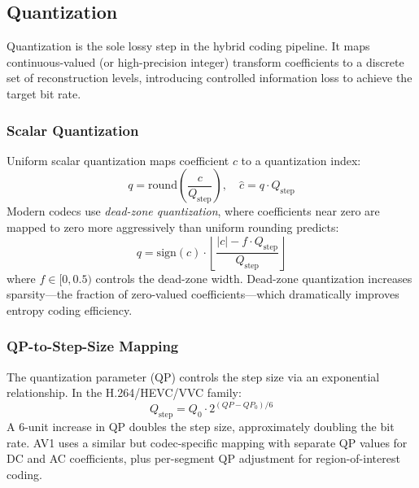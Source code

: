 \subsection{Quantization}
\label{sec:quantization}

Quantization is the sole lossy step in the hybrid coding pipeline. It maps
continuous-valued (or high-precision integer) transform coefficients to a
discrete set of reconstruction levels, introducing controlled information
loss to achieve the target bit rate.

\subsubsection{Scalar Quantization}

Uniform scalar quantization maps coefficient $c$ to a quantization index:
\begin{equation}
  q = \text{round}\!\left(\frac{c}{Q_{\text{step}}}\right), \quad
  \hat{c} = q \cdot Q_{\text{step}}
  \label{eq:uniform-quant}
\end{equation}
Modern codecs use \emph{dead-zone quantization}, where coefficients near
zero are mapped to zero more aggressively than uniform rounding predicts:
\begin{equation}
  q = \text{sign}(c) \cdot \left\lfloor
    \frac{|c| - f \cdot Q_{\text{step}}}{Q_{\text{step}}}
  \right\rfloor
  \label{eq:deadzone}
\end{equation}
where $f \in [0, 0.5)$ controls the dead-zone width. Dead-zone
quantization increases sparsity---the fraction of zero-valued
coefficients---which dramatically improves entropy coding efficiency.

\subsubsection{QP-to-Step-Size Mapping}

The quantization parameter (QP) controls the step size via an exponential
relationship. In the H.264/HEVC/VVC family:
\begin{equation}
  Q_{\text{step}} = Q_0 \cdot 2^{(QP - QP_0)/6}
  \label{eq:qp-mapping}
\end{equation}
A 6-unit increase in QP doubles the step size, approximately doubling the
bit rate. AV1 uses a similar but codec-specific mapping with separate QP
values for DC and AC coefficients, plus per-segment QP adjustment for
region-of-interest coding.

